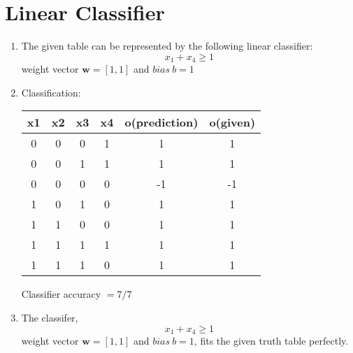 
\newpage
\section{Linear Classifier}
\label{sec:q2}

\begin{enumerate}
\item The given table can be represented by the following linear classifier:\\
$$
x_1+ x_4\geq 1
$$
weight vector $\boldsymbol w = [1, 1]$ and $bias\  b = 1$

\item Classification:\\

 \begin{table}[h]
        \centering
        \begin{tabular}{cccc|c|c}
            x1 & x2 & x3 & x4 & o(prediction)	& o(given)  \\ \hline
            0  & 0  & 0  & 1  & 1 			    & 1  \\
            0  & 0  & 1  & 1  & 1				& 1  \\
            0  & 0  & 0  & 0  & -1				& -1 \\
            1  & 0  & 1  & 0  & 1				& 1  \\
            1  & 1  & 0  & 0  & 1				& 1  \\
            1  & 1  & 1  & 1  & 1				& 1  \\
            1  & 1  & 1  & 0  & 1				& 1  \\
        \end{tabular}
        \end{table}

Classifier accuracy $= 7/7$

\item


The classifer, \\
$$x_1 + x_4 \geq 1$$ 
weight vector $\boldsymbol w = [1, 1]$ and $bias\  b = 1$,
fits the given truth table perfectly.

\end{enumerate}


